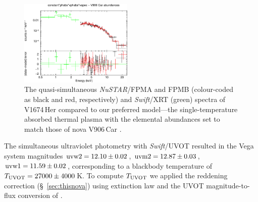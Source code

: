\documentclass[a4paper,fleqn,usenatbib]{mnras}
\newcommand{\nova}{V1674\,Her}
\begin{document}
\begin{figure}
        \includegraphics[width=0.48\textwidth]{const_phabs_vphabs_vapec__NCar__swift.eps}
    \caption{The quasi-simultaneous {\em NuSTAR}/FPMA and FPMB (colour-coded
as black and red, respectively) and {\em Swift}/XRT (green) spectra of \nova{}
compared to our preferred model---the single-temperature absorbed thermal plasma 
with the elemental abundances set to match those of nova V906\,Car \citep{2020MNRAS.497.2569S}.}
    \label{fig:nuswspec}
\end{figure}

The simultaneous ultraviolet photometry with {\em Swift}/UVOT resulted in the Vega system magnitudes 
${\rm uvw2} = 12.10 \pm 0.02$,
${\rm uvm2} = 12.87 \pm 0.03$,
${\rm uvw1} = 11.59 \pm 0.02$,
corresponding to a blackbody temperature of $T_{\rm UVOT} = 27000 \pm 4000$\,K. 
To compute $T_{\rm UVOT}$ we applied the reddening correction (\S~\ref{sec:thisnova})
using \cite{1989ApJ...345..245C} extinction law and the UVOT magnitude-to-flux conversion
of \cite{2008MNRAS.383..627P}.
\end{document}
